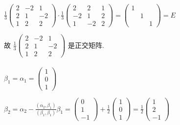 \begin{enumerate}
			       \( \frac{1}{3}
			       \begin{pmatrix}
				       2 & -2 & 1  \\
				       2 & 1  & -2 \\
				       1 & 2  & 2
			       \end{pmatrix} \cdot \frac{1}{3} \begin{pmatrix}
				       2  & 2  & 1 \\
				       -2 & 1  & 2 \\
				       1  & -2 & 2
			       \end{pmatrix} =
			       \begin{pmatrix}
				       1 &   &   \\
				         & 1 &   \\
				         &   & 1
			       \end{pmatrix} = E \)

			       故 \( \frac{1}{3}
			       \begin{pmatrix}
				       2 & -2 & 1  \\
				       2 & 1  & -2 \\
				       1 & 2  & 2\end{pmatrix} \) 是正交矩阵.
		 \end{enumerate}

	 \paragraph{} %
		 \( \beta_{1} = \alpha_{1} =
		 \begin{pmatrix}
			 1 \\
			 0 \\
			 1\end{pmatrix} \)

		 \( \beta_{2} = \alpha_{2} - \frac{(\alpha_{2}, \beta_{1})}{(\beta_{1}, \beta_{1})} \beta_{1} =
		 \begin{pmatrix}
			 0 \\
			 1 \\
			 -1\end{pmatrix} + \frac{1}{2}
		 \begin{pmatrix}
			 1 \\
			 0 \\
			 1\end{pmatrix} = \frac{1}{2}
		 \begin{pmatrix}
			 1 \\
			 2 \\
			 -1\end{pmatrix} \)

